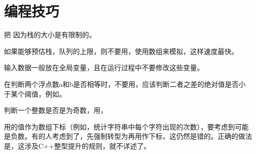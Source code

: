 \chapter{编程技巧}
把 因为栈的大小是有限制的。

如果能够预估栈，队列的上限，则不要用，使用数组来模拟，这样速度最快。

输入数据一般放在全局变量，且在运行过程中不要修改这些变量。

在判断两个浮点数a和b是否相等时，不要用，应该判断二者之差的绝对值是否小于某个阈值，例如。 

判断一个整数是否是为奇数，用，

用的值作为数组下标（例如，统计字符串中每个字符出现的次数），要考虑到可能是负数。有的人考虑到了，先强制转型为再用作下标，这仍然是错的。正确的做法是，这涉及C++整型提升的规则，就不详述了。
